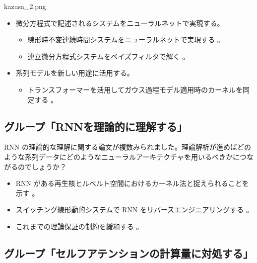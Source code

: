 \documentclass[b5paper,xelatex,ja=standard,10pt]{bxjsarticle}
\begin{document}
\begin{SERIFU}[colback=PaleIris, colbacktitle=PaleIris2]{kazusa_2.png}
\begin{itemize}
  \vspace{5pt}
  \item 微分方程式で記述されるシステムをニューラルネットで実現する。
  \begin{itemize}
    \item 線形時不変連続時間システムをニューラルネットで実現する \cite{AlbertGu2021}。
    \item 連立微分方程式システムをベイズフィルタで解く \cite{JonathanSchmidt2021}。
  \end{itemize}
  
  \vspace{5pt}
  \item 系列モデルを新しい用途に活用する。
  \begin{itemize}
    \item トランスフォーマーを活用してガウス過程モデル適用時のカーネルを同定する \cite{FergusSimpson2021}。
  \end{itemize}
\end{itemize}
\end{SERIFU}

\subsection*{グループ「RNNを理論的に理解する」}

RNN の理論的な理解に関する論文が複数みられました。理論解析が進めばどのような系列データにどのようなニューラルアーキテクチャを用いるべきかにつながるのでしょうか？

\begin{itemize}
  \item RNN がある再生核ヒルベルト空間におけるカーネル法と捉えられることを示す \cite{AdelineFermanian2021}。
  \item スイッチング線形動的システムで RNN をリバースエンジニアリングする \cite{JimmySmith2021}。
  \item これまでの理論保証の制約を緩和する \cite{LifuWang2021} \cite{AbhishekPanigrahi2021}。
\end{itemize}

\subsection*{グループ「セルフアテンションの計算量に対処する」}
\end{document}
